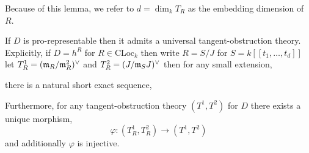 \documentclass[12pt]{article}
\newcommand{\CLoc}{\mathrm{CLoc}}
\newcommand{\ob}{\mathrm{ob}}
\begin{document}
\begin{rmk}
Because of this lemma, we refer to $d = \dim_k T_R$ as the embedding dimension of $R$. 
\end{rmk}

\begin{thm}
If $D$ is pro-representable then it admits a universal tangent-obstruction theory. Explicitly, if $D = h^R$ for $R \in \CLoc_k$ then write $R = S / J$ for $S = k[[t_1, \dots, t_d]]$ let $T^1_R = (\mathfrak{m}_R / \mathfrak{m}_R^2)^\vee$ and $T^2_{R} = (J / \mathfrak{m}_S J)^\vee$ then for any small extension,
\begin{center}
\end{center}
there is a natural short exact sequence,
\begin{center}
\end{center}
Furthermore, for any tangent-obstruction theory $(T^1, T^2)$ for $D$ there exists a unique morphism,
\[ \varphi : (T^1_R, T^2_R) \to (T^1, T^2) \]
and additionally $\varphi$ is injective.
\end{thm}
\end{document}

